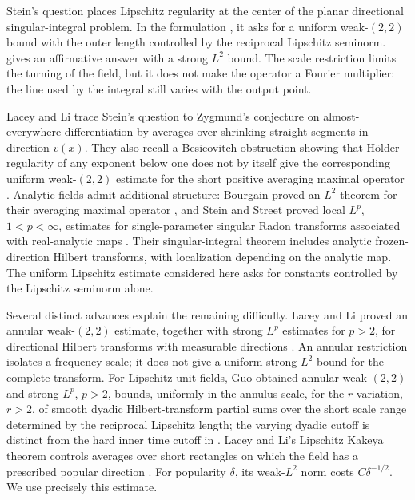 Stein's question places Lipschitz regularity at the center of the
planar directional singular-integral problem. In the formulation
\cite[Conjecture~1.5]{LLStein}, it asks for a uniform weak-\((2,2)\)
bound with the outer length controlled by the reciprocal Lipschitz
seminorm.  gives an affirmative answer with a strong
\(L^2\) bound. The scale restriction limits the turning of the field,
but it does not make the operator a Fourier multiplier: the line
used by the integral still varies with the output point.

Lacey and Li trace Stein's question to Zygmund's conjecture on
almost-everywhere differentiation by averages over shrinking straight
segments in direction \(v(x)\). They also recall a Besicovitch
obstruction showing that H\"older regularity of any exponent below one
does not by itself give the corresponding uniform weak-\((2,2)\)
estimate for the short positive averaging maximal operator
\cite[Preface, Conjecture~1.2 and Chapter~2]{LLStein}.
Analytic fields admit additional structure:
Bourgain proved an \(L^2\) theorem for their averaging maximal
operator \cite{Bourgain1989}, and Stein and Street proved local
\(L^p\), \(1<p<\infty\), estimates for single-parameter singular
Radon transforms associated with real-analytic maps
\cite{SteinStreet2012}. Their
singular-integral theorem includes analytic frozen-direction Hilbert
transforms, with localization depending on the analytic map. The
uniform Lipschitz estimate considered here asks for constants
controlled by the Lipschitz seminorm alone.

Several distinct advances explain the remaining difficulty. Lacey
and Li proved an annular weak-\((2,2)\) estimate, together with strong
\(L^p\) estimates for \(p>2\), for directional Hilbert transforms
with measurable directions \cite[Theorem~1.1]{LLAnnular}. An annular
restriction isolates a frequency scale; it does not give a uniform
strong \(L^2\) bound for the complete transform. For Lipschitz unit
fields, Guo obtained annular weak-\((2,2)\) and strong \(L^p\),
\(p>2\), bounds, uniformly in the annulus scale, for the
\(r\)-variation, \(r>2\), of
smooth dyadic Hilbert-transform partial sums over the short scale range
determined by the reciprocal Lipschitz length; the varying dyadic
cutoff is distinct from the hard inner time cutoff in 
\cite[Theorem~1.2 and (1.6)--(1.8) of the author version]{GuoVariation2017}.
Lacey and Li's Lipschitz Kakeya theorem controls averages over short
rectangles on which the field has a prescribed popular direction
\cite[Theorem~1.4]{LLKakeya}.
For popularity \(\delta\), its weak-\(L^2\) norm costs
\(C\delta^{-1/2}\). We use precisely this estimate.


